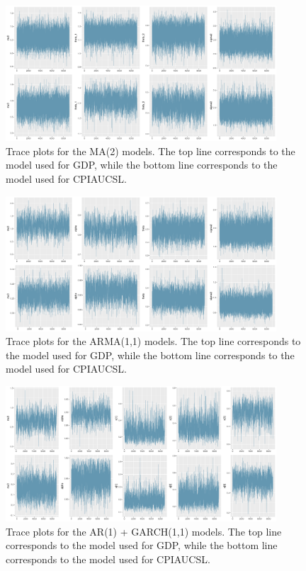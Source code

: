 \begin{figure}[H]
    \centering
    \includegraphics[width=0.9\textwidth]{images/3-MA/traceplots2.png}
    \caption{Trace plots for the MA(2) models. The top line corresponds to the model used for GDP, while the bottom line corresponds to the model used for CPIAUCSL.}
\end{figure}
\begin{figure}[H]
    \centering
    \includegraphics[width=0.9\textwidth]{images/4-ARMA/traceplots.png}
    \caption{Trace plots for the ARMA(1,1) models. The top line corresponds to the model used for GDP, while the bottom line corresponds to the model used for CPIAUCSL.}
\end{figure}
\begin{figure}[H]
    \centering
    \includegraphics[width=0.9\textwidth]{images/5-GARCH/traceplots.png}
    \caption{Trace plots for the AR(1) + GARCH(1,1) models. The top line corresponds to the model used for GDP, while the bottom line corresponds to the model used for CPIAUCSL.}
\end{figure}
